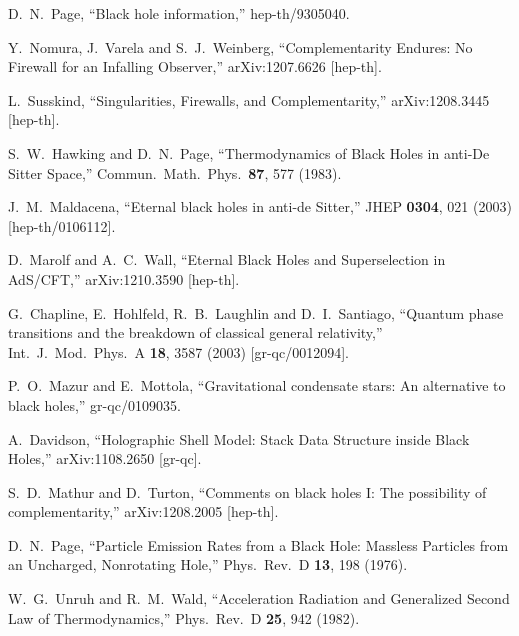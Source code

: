 \documentclass[12pt]{article}
\begin{document}
\begin{thebibliography}{99}
  D.~N.~Page,
  ``Black hole information,''
  hep-th/9305040.

  Y.~Nomura, J.~Varela and S.~J.~Weinberg,
  ``Complementarity Endures: No Firewall for an Infalling Observer,''
  arXiv:1207.6626 [hep-th].

  L.~Susskind,
  ``Singularities, Firewalls, and Complementarity,''
  arXiv:1208.3445 [hep-th].

  S.~W.~Hawking and D.~N.~Page,
  ``Thermodynamics of Black Holes in anti-De Sitter Space,''
  Commun.\ Math.\ Phys.\  {\bf 87}, 577 (1983).

  J.~M.~Maldacena,
  ``Eternal black holes in anti-de Sitter,''
  JHEP {\bf 0304}, 021 (2003)
  [hep-th/0106112].

D.~Marolf and A.~C.~Wall,
  ``Eternal Black Holes and Superselection in AdS/CFT,''
  arXiv:1210.3590 [hep-th].

  G.~Chapline, E.~Hohlfeld, R.~B.~Laughlin and D.~I.~Santiago,
  ``Quantum phase transitions and the breakdown of classical general relativity,''
  Int.\ J.\ Mod.\ Phys.\ A {\bf 18}, 3587 (2003)
  [gr-qc/0012094].

  P.~O.~Mazur and E.~Mottola,
  ``Gravitational condensate stars: An alternative to black holes,''
  gr-qc/0109035.

  A.~Davidson,
  ``Holographic Shell Model: Stack Data Structure inside Black Holes,''
  arXiv:1108.2650 [gr-qc].

  S.~D.~Mathur and D.~Turton,
  ``Comments on black holes I: The possibility of complementarity,''
  arXiv:1208.2005 [hep-th].

  D.~N.~Page,
  ``Particle Emission Rates from a Black Hole: Massless Particles from an Uncharged, Nonrotating Hole,''
  Phys.\ Rev.\ D {\bf 13}, 198 (1976).

  W.~G.~Unruh and R.~M.~Wald,
  ``Acceleration Radiation and Generalized Second Law of Thermodynamics,''
  Phys.\ Rev.\ D {\bf 25}, 942 (1982).


\end{thebibliography}
\end{document}
